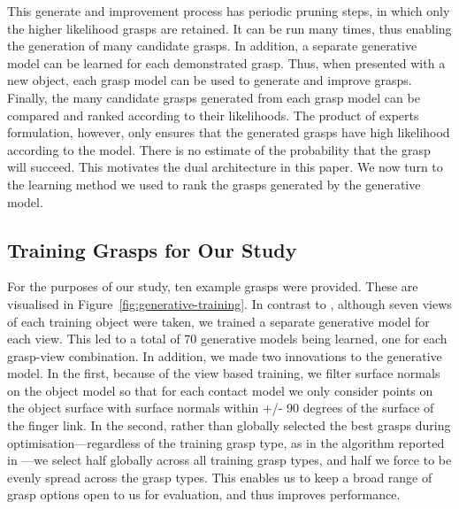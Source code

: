 This generate and improvement process has periodic pruning steps, in which only the higher likelihood grasps are retained. It can be run many times, thus enabling the generation of many candidate grasps. In addition, a separate generative model can be learned for each demonstrated grasp. Thus, when presented with a new object, each grasp model can be used to generate and improve grasps. Finally, the many candidate grasps generated from each grasp model can be compared and ranked according to their likelihoods. The product of experts formulation, however, only ensures that the generated grasps have high likelihood according to the model. There is no estimate of the probability that the grasp will succeed. This motivates the dual architecture in this paper. We now turn to the learning method we used to rank the grasps generated by the generative model. 

\subsection{Training Grasps for Our Study}

For the purposes of our study, ten example grasps were provided. These are visualised in Figure~\ref{fig:generative-training}. In contrast to \cite{kopicki2015ijrr}, although seven views of each training object were taken, we trained a separate generative model for each view. This led to a total of 70 generative models being learned, one for each grasp-view combination. In addition, we made two innovations to the generative model. In the first, because of the view based training, we filter surface normals on the object model so that for each contact model we only consider points on the object surface with surface normals within +/- 90 degrees of the surface of the finger link. In the second, rather than globally selected the best grasps during optimisation---regardless of the training grasp type, as in the algorithm reported in \cite{kopicki2015ijrr}---we select half globally across all training grasp types, and half we force to be evenly spread across the grasp types. This enables us to keep a broad range of grasp options open to us for evaluation, and thus improves performance.
